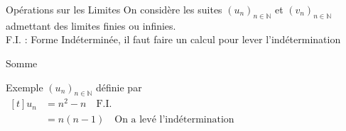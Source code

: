 \documentclass{coursbook}
\begin{document}
    \begin{Gpartie}{Opérations sur les Limites} 
        On considère les suites $(u_n)_{n\in\mathbb{N}}$ et $(v_n)_{n\in\mathbb{N}}$ admettant des limites finies ou infinies. \\ F.I. : Forme Indéterminée, il faut faire un calcul pour lever l'indétermination
        \begin{Spartie}{Somme}
            \begin{table}[H] \centering {} 
            \end{table}
            \begin{SSpartie}{Exemple} 
                $(u_n)_{n\in\mathbb{N}}$ définie par $\begin{aligned}[t]u_n&=n^2-n\quad\text{F.I.} \\ &=n(n-1)\quad\text{On a levé l'indétermination}\end{aligned}$


\end{SSpartie}
\end{Spartie}
\end{Gpartie}
\end{document}
